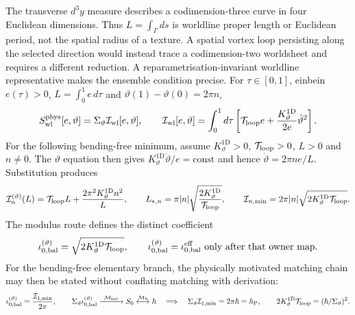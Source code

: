 \documentclass[11pt,a4paper]{article}
\begin{document}
The transverse $d^3y$ measure describes a codimension-three curve in four
Euclidean dimensions.  Thus $L=\int_\Gamma ds$ is worldline proper length or
Euclidean period, not the spatial radius of a texture.  A spatial vortex loop
persisting along the selected direction would instead trace a
codimension-two worldsheet and requires a different reduction.  A
reparametrisation-invariant worldline representative makes the ensemble
condition precise.  For $\tau\in[0,1]$, einbein $e(\tau)>0$,
$L=\int_0^1e\,d\tau$ and
$\vartheta(1)-\vartheta(0)=2\pi n$,
\begin{equation}
 S_{\rm wl}^{\rm phys}[e,\vartheta]
 =\Sigma_\vartheta\mathcal I_{\rm wl}[e,\vartheta],
 \qquad
 \mathcal I_{\rm wl}[e,\vartheta]
 =\int_0^1d\tau\left[
 \mathcal T_{\rm loop}e+
 \frac{K_\vartheta^{1\mathrm D}}{2e}\dot\vartheta^2\right].
 \label{eq:pop_balanced_loop}
\end{equation}
For the following bending-free minimum, assume
$K_\vartheta^{1\mathrm D}>0$, $\mathcal T_{\rm loop}>0$, $L>0$ and
$n\ne0$.  The $\vartheta$ equation then gives
$K_\vartheta^{1\mathrm D}\dot\vartheta/e=\mathrm{const}$ and hence
$\dot\vartheta=2\pi n e/L$.  Substitution produces
\begin{equation}
 \mathcal I_n^{(\vartheta)}(L)=\mathcal T_{\rm loop}L+
 \frac{2\pi^2K_\vartheta^{1\mathrm D}n^2}{L},
\qquad
 L_{*,n}=\pi|n|\sqrt{\frac{2K_\vartheta^{1\mathrm D}}
                                  {\mathcal T_{\rm loop}}},
\qquad
 \mathcal I_{n,\min}=2\pi|n|\sqrt{
 2K_\vartheta^{1\mathrm D}\mathcal T_{\rm loop}} .
 \label{eq:pop_balanced_min}
\end{equation}
The modulus route defines the distinct coefficient
\begin{equation}
 \iota_{0,\rm bal}^{(\vartheta)}
 =\sqrt{2K_\vartheta^{1\mathrm D}\mathcal T_{\rm loop}},
\qquad
 \iota_{0,\rm bal}^{(\vartheta)}=\iota_{0,\rm bal}^{\rm eff}
 \ \text{only after that owner map}.
 \label{eq:pop_balanced_relation}
\end{equation}
For the bending-free elementary branch, the physically motivated matching
chain may then be stated without conflating matching with derivation:
\begin{equation}
 \iota_{0,\rm bal}^{(\vartheta)}
 =\frac{\mathcal I_{1,\min}}{2\pi},\qquad
 \Sigma_\vartheta\iota_{0,\rm bal}^{(\vartheta)}
 \xrightarrow{\ \mathcal M_{\rm bal}\ }S_0
 \mathrel{\overset{\mathcal M_\hbar}{\longleftrightarrow}}\hbar
 \quad\Longrightarrow\quad
 \Sigma_\vartheta\mathcal I_{1,\min}=2\pi\hbar=h_{\rm P},
 \qquad
 2K_\vartheta^{1\mathrm D}\mathcal T_{\rm loop}=(\hbar/\Sigma_\vartheta)^2 .
 \label{eq:pop_planck_matching_conditional}
\end{equation}
\end{document}
